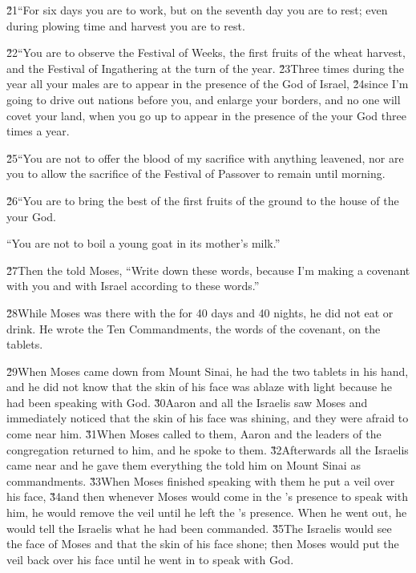 \v{21}``For six days you are to work, but on the seventh day you are to rest; even during plowing time and harvest you are to rest.

\v{22}``You are to observe the Festival of Weeks, the first fruits of the wheat harvest, and the Festival of Ingathering at the turn of the year. \v{23}Three times during the year all your males are to appear in the presence of the  God of Israel, \v{24}since I'm going to drive out nations before you, and enlarge your borders, and no one will covet your land, when you go up to appear in the presence of the  your God three times a year.

\v{25}``You are not to offer the blood of my sacrifice with anything leavened, nor are you to allow the sacrifice of the Festival of Passover to remain until morning.

\v{26}``You are to bring the best of the first fruits of the ground to the house of the  your God.

``You are not to boil a young goat in its mother's milk.''

\v{27}Then the  told Moses, ``Write down these words, because I'm making a covenant with you and with Israel according to these words.''

\v{28}While Moses was there with the  for 40 days and 40 nights, he did not eat or drink. He wrote the Ten Commandments, the words of the covenant, on the tablets.

\v{29}When Moses came down from Mount Sinai, he had the two tablets in his hand, and he did not know that the skin of his face was ablaze with light because he had been speaking with God. \v{30}Aaron and all the Israelis saw Moses and immediately noticed that the skin of his face was shining, and they were afraid to come near him. \v{31}When Moses called to them, Aaron and the leaders of the congregation returned to him, and he spoke to them. \v{32}Afterwards all the Israelis came near and he gave them everything the  told him on Mount Sinai as commandments. \v{33}When Moses finished speaking with them he put a veil over his face, \v{34}and then whenever Moses would come in the 's presence to speak with him, he would remove the veil until he left the 's presence. When he went out, he would tell the Israelis what he had been commanded. \v{35}The Israelis would see the face of Moses and that the skin of his face shone; then Moses would put the veil back over his face until he went in to speak with God.

